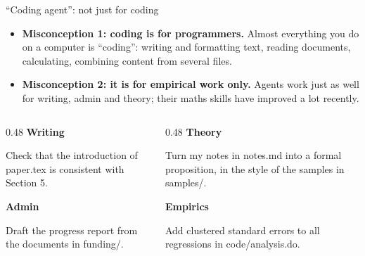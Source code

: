 \documentclass[aspectratio=169,11pt]{beamer}
\newcommand{\prompt}[1]{\begin{promptbox}\textcolor{accent}{\faCommentDots}\enspace #1\end{promptbox}}
\newcommand{\icon}[1]{\textcolor{accent}{#1}}
\begin{document}
\begin{frame}{``Coding agent'': not just for coding}
  \begin{itemize}
    \item \textbf{Misconception 1: coding is for programmers.} Almost everything you do on a computer is ``coding'': writing and formatting text, reading documents, calculating, combining content from several files.
    \item \textbf{Misconception 2: it is for empirical work only.} Agents work just as well for writing, admin and theory; their maths skills have improved a lot recently.
  \end{itemize}
  \vspace{0.3em}
  \begin{columns}[T]
    \begin{column}{0.48\textwidth}
      \icon{\faPen}\enspace\textbf{Writing}
      \prompt{Check that the introduction of paper.tex is consistent with Section 5.}
      \icon{\faClipboardList}\enspace\textbf{Admin}
      \prompt{Draft the progress report from the documents in funding/.}
    \end{column}
    \begin{column}{0.48\textwidth}
      \icon{\faInfinity}\enspace\textbf{Theory}
      \prompt{Turn my notes in notes.md into a formal proposition, in the style of the samples in samples/.} 
      \icon{\faChartBar}\enspace\textbf{Empirics}
      \prompt{Add clustered standard errors to all regressions in code/analysis.do.}
    \end{column}
  \end{columns}
\end{frame}
\end{document}
